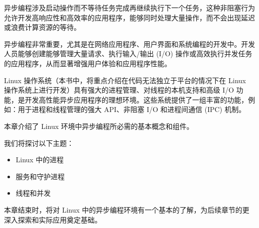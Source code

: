 异步编程涉及启动操作而不等待任务完成再继续执行下一个任务，这种非阻塞行为允许开发高响应性和高效率的应用程序，能够同时处理大量操作，而不会出现延迟或浪费计算资源的等待。

异步编程非常重要，尤其是在网络应用程序、用户界面和系统编程的开发中。开发人员能够创建能够管理大量请求、执行输入/输出 (I/O) 操作或高效执行并发任务的应用程序，从而显著增强用户体验和应用程序性能。

Linux 操作系统（本书中，将重点介绍在代码无法独立于平台的情况下在 Linux 操作系统上进行开发）具有强大的进程管理、对线程的本机支持和高级 I/O 功能，是开发高性能异步应用程序的理想环境。这些系统提供了一组丰富的功能，例如：用于进程和线程管理的强大 API、非阻塞 I/O 和进程间通信 (IPC) 机制。

本章介绍了 Linux 环境中异步编程所必需的基本概念和组件。

我们将探讨以下主题：

\begin{itemize}
\item
Linux 中的进程

\item
服务和守护进程

\item
线程和并发
\end{itemize}

本章结束时，将对 Linux 中的异步编程环境有一个基本的了解，为后续章节的更深入探索和实际应用奠定基础。































